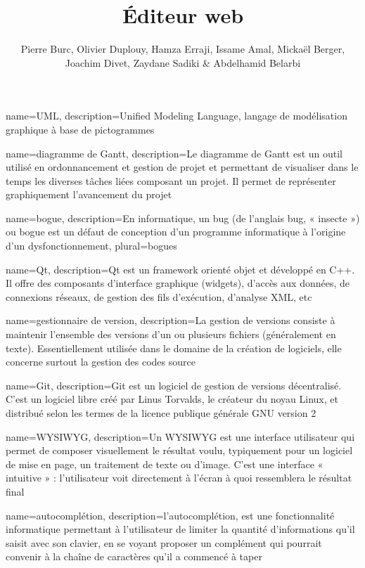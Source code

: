 \documentclass[a4paper, 12pt]{report}
\title{Éditeur web}
\author{Pierre Burc, Olivier Duplouy, Hamza Erraji, Issame Amal, Mickaël Berger, Joachim Divet, Zaydane Sadiki & Abdelhamid Belarbi}
\begin{document}
	{
		name=UML,
		description={Unified Modeling Language, langage de modélisation graphique à base de pictogrammes}
	}

	{
		name=diagramme de Gantt,
		description={Le diagramme de Gantt est un outil utilisé en ordonnancement et gestion de projet et permettant de visualiser dans le temps
		les diverses tâches liées composant un projet. Il permet de représenter graphiquement l'avancement du projet}
	}
	
	{
		name=bogue,
		description={En informatique, un bug (de l’anglais bug, « insecte ») ou bogue est un défaut de conception d'un programme
		informatique à l'origine d'un dysfonctionnement},
		plural=bogues
	}
		
	{
		name=Qt,
		description={Qt est un framework orienté objet et développé en C++. Il offre des composants d'interface graphique (widgets),
		d'accès aux données, de connexions réseaux, de gestion des fils d'exécution, d'analyse XML, etc}
	}

	{
		name=gestionnaire de version,
		description={La gestion de versions consiste à maintenir l'ensemble des versions d'un ou plusieurs fichiers (généralement en texte).
		Essentiellement utilisée dans le domaine de la création de logiciels, elle concerne surtout la gestion des codes source}
	}

	{
		name=Git,
		description={Git est un logiciel de gestion de versions décentralisé. 
		C'est un logiciel libre créé par Linus Torvalds, le créateur du noyau Linux, et distribué selon les termes de la licence 
		publique générale GNU version 2}
	}

	{
		name=WYSIWYG,
		description={Un WYSIWYG est une interface utilisateur qui permet de composer visuellement le résultat voulu, typiquement 
		pour un logiciel de mise en page, un traitement de texte ou d’image. 
		C'est une interface « intuitive » : l’utilisateur voit directement à l’écran à quoi ressemblera le résultat final}
	}
	
	{
		name=autocomplétion,
		description={l'autocomplétion, est une fonctionnalité informatique permettant à l'utilisateur de limiter la quantité d'informations 
		qu'il saisit avec son clavier, en se voyant proposer un complément qui pourrait convenir à la chaîne de caractères qu'il a commencé à taper}
	}
\end{document}
